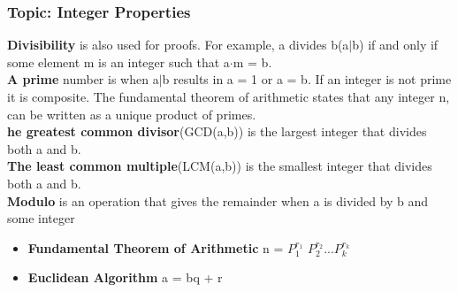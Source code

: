 \documentclass{article}
\begin{document}
\subsubsection{Topic: Integer Properties}
\textbf{Divisibility} is also used for proofs. For example, a divides b(a$\mid$b) if and only if some element m is an integer such that a$\cdot$m = b.
\\\textbf{A prime} number is when a$\mid$b results in a = 1 or a = b. If an integer
is not prime it is composite. The fundamental theorem of arithmetic
states that any integer n, can be written as a unique product of primes. \\ \textbf{he greatest common divisor}(GCD(a,b)) is the largest integer
that divides both a and b. \\\textbf{The least common multiple}(LCM(a,b)) is the
smallest integer that divides both a and b. \\\textbf{Modulo}  is an operation that gives the remainder when a is divided by b and some integer
\begin{itemize}
    \item \textbf{Fundamental Theorem of Arithmetic} n = $P_1^{r_1}$ $P_2^{r_2}$...$P_k^{r_k}$
    \item \textbf{Euclidean Algorithm} a = bq + r
\end{itemize}
\end{document}
